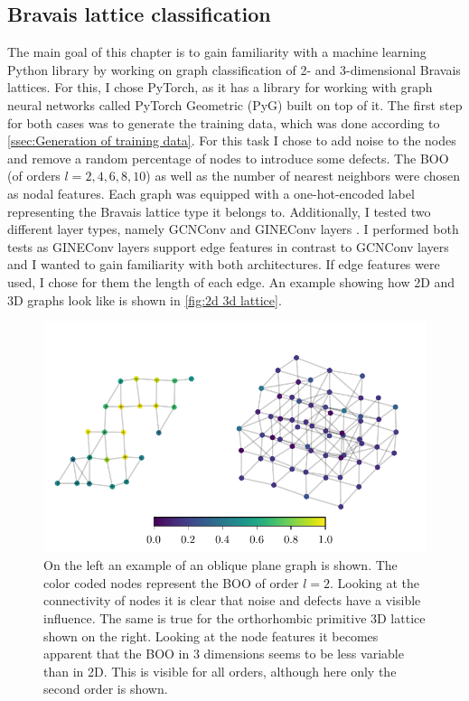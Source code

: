 \documentclass[11pt,a4paper]{article}
\begin{document}
\subsection{Bravais lattice classification}
\label{ssec:Bravais lattice classification}
The main goal of this chapter is to gain familiarity with a machine learning Python library by working on graph classification of 2- and 3-dimensional Bravais lattices. 
For this, I chose PyTorch, as it has a library for working with graph neural networks called PyTorch Geometric (PyG) built on top of it. 
The first step for both cases was to generate the training data, which was done according to \autoref{ssec:Generation of training data}. 
For this task I chose to add noise to the nodes and remove a random percentage of nodes to introduce some defects. 
The BOO (of orders $l=2,4,6,8,10$) as well as the number of nearest neighbors  were chosen as nodal features. 
Each graph was equipped with a one-hot-encoded label representing the Bravais lattice type it belongs to. 
Additionally, I tested two different layer types, namely GCNConv \cite{pygteamGCNConv2025} and GINEConv layers \cite{pygteamGINEConv2024}. 
I performed both tests as GINEConv layers support edge features in contrast to GCNConv layers and I wanted to gain familiarity with both architectures. 
If edge features were used, I chose for them the length of each edge. 
An example showing how 2D and 3D graphs look like is shown in \autoref{fig:2d 3d lattice}. 

\begin{figure}[htbp]
    \centering
    \includegraphics{images/plots/2d_3d_lattice.pdf}
    \caption{On the left an example of an oblique plane graph is shown. The color coded nodes represent the BOO of order $l=2$. Looking at the connectivity of nodes it is clear that noise and defects have a visible influence. The same is true for the orthorhombic primitive 3D lattice shown on the right. Looking at the node features it becomes apparent that the BOO in 3 dimensions seems to be less variable than in 2D. This is visible for all orders, although here only the second order is shown.}
    \label{fig:2d 3d lattice}
\end{figure}
\end{document}
